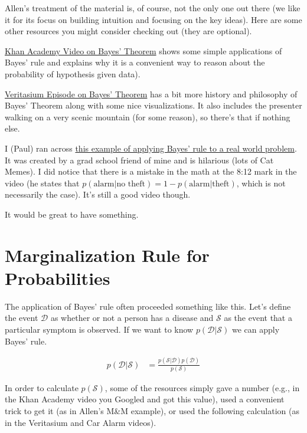 \documentclass[assignment01_Solutions]{subfiles}
\begin{document}
\begin{externalresources}[(60 minutes)]
Allen's treatment of the material is, of course, not the only one out there (we like it for its focus on building intuition and focusing on the key ideas).  Here are some other resources you might consider checking out (they are optional).
\bi
\item \href{https://www.khanacademy.org/partner-content/wi-phi/wiphi-critical-thinking/wiphi-fundamentals/v/bayes-theorem}{Khan Academy Video on Bayes' Theorem} shows some simple applications of Bayes' rule and explains why it is a convenient way to reason about the probability of hypothesis given data).
\item \href{https://www.youtube.com/watch?v=R13BD8qKeTg}{Veritasium Episode on Bayes' Theorem} has a bit more history and philosophy of Bayes' Theorem along with some nice visualizations.  It also includes the presenter walking on a very scenic mountain (for some reason), so there's that if nothing else.
\item I (Paul) ran across \href{https://youtube.com/watch?v=nvqXXlz-rx0}{this example of applying Bayes' rule to a real world problem}.  It was created by a grad school friend of mine and is hilarious (lots of Cat Memes).  I did notice that there is a mistake in the math at the 8:12 mark in the video (he states that $p(\mbox{alarm} | \mbox{no theft}) = 1 - p(\mbox{alarm} | \mbox{theft})$, which is not necessarily the case).  It's still a good video though.
\ei

\end{externalresources}

\begin{exercise}
It would be great to have something.
\end{exercise}

\section{Marginalization Rule for Probabilities}
The application of Bayes' rule often proceeded something like this.  Let's define the event $\mathcal{D}$ as whether or not a person has a disease and $\mathcal{S}$ as the event that a particular symptom is observed.  If we want to know $p(\mathcal{D} | \mathcal{S})$ we can apply Bayes' rule.

\begin{align}
p(\mathcal{D} | \mathcal{S}) &= \frac{p(\mathcal{S} | \mathcal{D}) p(\mathcal{D})}{p(\mathcal{S})} \label{eq:bayesdenominator}
\end{align}

In order to calculate $p(\mathcal{S})$, some of the resources simply gave a number (e.g., in the Khan Academy video you Googled and got this value), used a convenient trick to get it (as in Allen's M\&M example), or used the following calculation (as in the Veritasium and Car Alarm videos).
\end{document}
